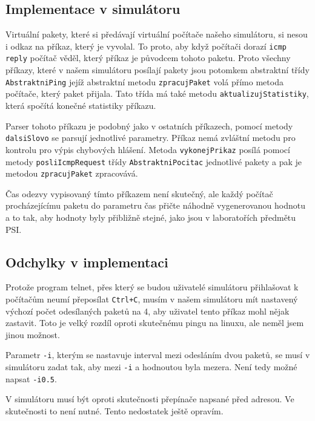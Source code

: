\subsection{Implementace v simulátoru}

Virtuální pakety, které si předávají virtuální počítače našeho simulátoru, si nesou i odkaz na příkaz, který je vyvolal. To proto, aby když počítači dorazí \verb|icmp reply| počítač věděl, který příkaz je původcem tohoto paketu. Proto všechny příkazy, které v našem simulátoru posílají pakety jsou potomkem abstraktní třídy \verb|AbstraktniPing| jejíž abstraktní metodu \verb|zpracujPaket| volá přímo metoda počítače, který paket přijala. Tato třída má také metodu \verb|aktualizujStatistiky|, která spočítá konečné statistiky příkazu.

Parser tohoto příkazu je podobný jako v ostatních příkazech, pomocí metody \verb|dalsiSlovo| se parsují jednotlivé parametry. Příkaz nemá zvláštní metodu pro kontrolu pro výpis chybových hlášení. Metoda \verb|vykonejPrikaz| posílá pomocí metody \verb|posliIcmpRequest| třídy \verb|AbstraktniPocitac| jednotlivé pakety a pak je metodou \verb|zpracujPaket| zpracovává.

Čas odezvy vypisovaný tímto příkazem není skutečný, ale každý počítač procházejícímu paketu do parametru čas přičte náhodně vygenerovanou hodnotu a to tak, aby hodnoty byly přibližně stejné, jako jsou v laboratořích předmětu PSI.


\subsection{Odchylky v implementaci}

Protože program telnet, přes který se budou uživatelé simulátoru přihlašovat k počítačům neumí přeposílat \verb|Ctrl+C|, musím v našem simulátoru mít nastavený výchozí počet odesílaných paketů na 4, aby uživatel tento příkaz mohl nějak zastavit. Toto je velký rozdíl oproti skutečnému pingu na linuxu, ale neměl jsem jinou možnost.

Parametr \verb|-i|, kterým se nastavuje interval mezi odesláním dvou paketů, se musí v simulátoru zadat tak, aby mezi \verb|-i| a hodnoutou byla mezera. Není tedy možné napsat \verb|-i0.5|.

V simulátoru musí být oproti skutečnosti přepínače napsané před adresou. Ve skutečnosti to není nutné. Tento nedostatek ještě opravím.




